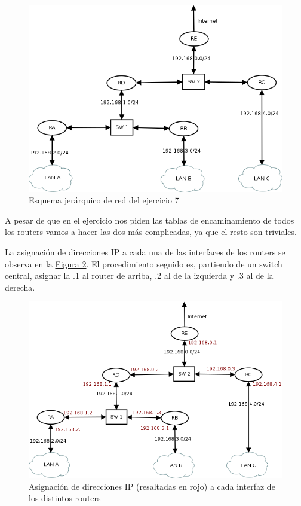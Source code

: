 \documentclass[10pt,a4paper,spanish]{report}
\begin{document}
\begin{figure}[!h]
  \centering
  \includegraphics[width=1\textwidth]{ejercicio7}
  \caption{Esquema jerárquico de red del ejercicio 7}
  \label{ej7}
\end{figure}

A pesar de que en el ejercicio nos piden las tablas de encaminamiento de todos los routers vamos a hacer las dos más complicadas, ya que el resto son triviales.


La asignación de direcciones IP a cada una de las interfaces de los routers se observa en la \hyperref[ej71]{Figura \ref*{ej71}}. El procedimiento seguido es, partiendo de un switch central, asignar la .1 al router de arriba, .2 al de la izquierda y .3 al de la derecha.

\begin{figure}[!h]
  \centering
  \includegraphics[width=1\textwidth]{ejercicio71}
  \caption{Asignación de direcciones IP (resaltadas en rojo) a cada interfaz de los distintos routers}
  \label{ej71}
\end{figure}
\end{document}
